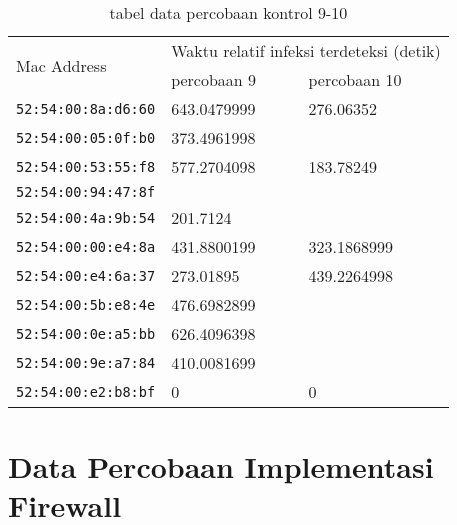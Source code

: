 \begin{table}[H]
	\caption{tabel data percobaan kontrol 9-10}
	\label{table:data percobaan kontrol 9_10}
	\centering
	\footnotesize
	\begin{tabular}{|l|l|l|}
		\hline
		\multirow{2}{*}{Mac Address} & \multicolumn{2}{c|}{Waktu relatif infeksi terdeteksi (detik)} \\ \cline{2-3} 
		& percobaan 9 & percobaan 10 \\ \hline
		\footnotesize{\verb|52:54:00:8a:d6:60|} & 643.0479999 & 276.06352 \\ \hline
		\footnotesize{\verb|52:54:00:05:0f:b0|} & 373.4961998 &  \\ \hline
		\footnotesize{\verb|52:54:00:53:55:f8|} & 577.2704098 & 183.78249 \\ \hline
		\footnotesize{\verb|52:54:00:94:47:8f|} &  &  \\ \hline
		\footnotesize{\verb|52:54:00:4a:9b:54|} & 201.7124 &  \\ \hline
		\footnotesize{\verb|52:54:00:00:e4:8a|} & 431.8800199 & 323.1868999 \\ \hline
		\footnotesize{\verb|52:54:00:e4:6a:37|} & 273.01895 & 439.2264998 \\ \hline
		\footnotesize{\verb|52:54:00:5b:e8:4e|} & 476.6982899 &  \\ \hline
		\footnotesize{\verb|52:54:00:0e:a5:bb|} & 626.4096398 &  \\ \hline
		\footnotesize{\verb|52:54:00:9e:a7:84|} & 410.0081699 &  \\ \hline
		\footnotesize{\verb|52:54:00:e2:b8:bf|} & 0 & 0 \\ \hline
	\end{tabular}
\end{table}

\pagebreak

\section{Data Percobaan Implementasi Firewall}

